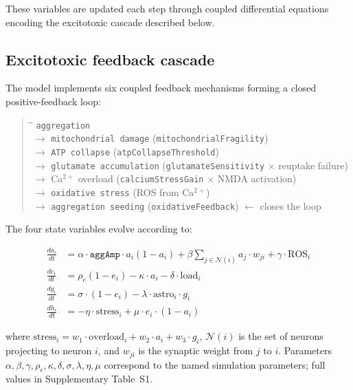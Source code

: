 \documentclass[12pt,a4paper]{article}
\begin{document}
These variables are updated each step through coupled differential equations encoding the
excitotoxic cascade described below.

\clearpage
\subsection{Excitotoxic feedback cascade}

The model implements six coupled feedback mechanisms forming a closed positive-feedback loop:

\begin{quote}
\begin{tabbing}
\hspace{2cm}\=\hspace{5.5cm}\=\kill
\>\texttt{aggregation}\\
\>$\rightarrow$ \texttt{mitochondrial damage} \>(\texttt{mitochondrialFragility})\\
\>$\rightarrow$ \texttt{ATP collapse} \>(\texttt{atpCollapseThreshold})\\
\>$\rightarrow$ \texttt{glutamate accumulation} \>(\texttt{glutamateSensitivity} $\times$
reuptake failure)\\
\>$\rightarrow$ Ca$^{2+}$ overload \>(\texttt{calciumStressGain} $\times$ NMDA activation)\\
\>$\rightarrow$ \texttt{oxidative stress} \>(ROS from Ca$^{2+}$)\\
\>$\rightarrow$ \texttt{aggregation seeding} \>(\texttt{oxidativeFeedback}) $\leftarrow$
closes the loop\\
\end{tabbing}
\end{quote}

The four state variables evolve according to:

\begin{align}
\frac{da_i}{dt} &= \alpha \cdot \texttt{aggAmp} \cdot a_i(1-a_i)
  + \beta \sum_{j \in \mathcal{N}(i)} a_j \cdot w_{ji} + \gamma \cdot \text{ROS}_i
  \label{eq:agg}\\
\frac{de_i}{dt} &= \rho_e(1-e_i) - \kappa \cdot a_i - \delta \cdot \text{load}_i
  \label{eq:atp}\\
\frac{dg_i}{dt} &= \sigma \cdot (1-e_i) - \lambda \cdot \text{astro}_i \cdot g_i
  \label{eq:glut}\\
\frac{dh_i}{dt} &= -\eta \cdot \text{stress}_i + \mu \cdot e_i \cdot (1-a_i)
  \label{eq:health}
\end{align}

where $\text{stress}_i = w_1 \cdot \text{overload}_i + w_2 \cdot a_i + w_3 \cdot g_i$,
$\mathcal{N}(i)$ is the set of neurons projecting to neuron $i$, and $w_{ji}$ is the synaptic
weight from $j$ to $i$. Parameters $\alpha, \beta, \gamma, \rho_e, \kappa, \delta, \sigma,
\lambda, \eta, \mu$ correspond to the named simulation parameters; full values in Supplementary
Table~S1.
\end{document}
